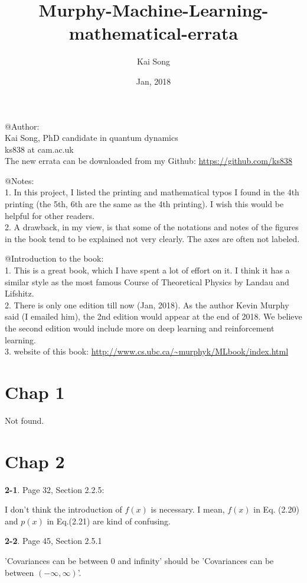 \documentclass[aps,preprint,a4]{revtex4-1}
\begin{document}
\title{Murphy-Machine-Learning-mathematical-errata}
\author{Kai Song}
\date{Jan, 2018}
\maketitle
@Author: \\
         Kai Song, PhD candidate in quantum dynamics\\
         ks838 at cam.ac.uk\\
         The new errata can be downloaded from my Github: \url{https://github.com/ks838}

@Notes: \\
        1. In this project, I listed the printing and mathematical typos I found in the 4th printing (the 5th, 6th are the same as the 4th printing). I wish this would be helpful for other readers. \\
        2. A drawback, in my view, is that some of the notations and notes of the figures in the book tend to be explained not very clearly. The axes are often not labeled. 

@Introduction to the book:\\
        1. This is a great book, which I have spent a lot of effort on it. I think it has a similar style as the most famous  Course of Theoretical Physics by Landau and Lifshitz. \\
        2. There is only one edition till now (Jan, 2018). As the author Kevin Murphy said (I emailed him), the 2nd edition would appear at the end of 2018. We believe the second edition would include more on deep learning and reinforcement learning.\\
        3. website of this book: \url{http://www.cs.ubc.ca/~murphyk/MLbook/index.html}

\section{Chap 1}
Not found.
\section{Chap 2}
{\color{red}\textbf{2-1}}. Page 32, Section 2.2.5:

I don't think the introduction of $f(x)$ is necessary. I mean, $f(x)$ in Eq. (2.20) and $p(x)$ in Eq.(2.21)
are kind of confusing.

{\color{red}\textbf{2-2}}. Page 45, Section 2.5.1

'Covariances can be between 0 and infinity' should be 'Covariances can be between $(-\infty, \infty)$'.
\end{document}
